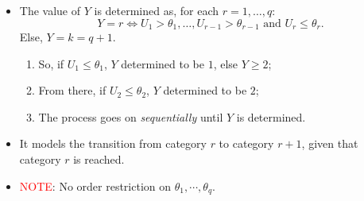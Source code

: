 \documentclass{beamer}
\newenvironment{wideitemize}%
  {\begin{itemize}%
    \setlength{\parskip}{1em}}%
  {\end{itemize}}
\begin{document}
\begin{frame}
\begin{wideitemize}
\item The value of
$Y$ is determined as, for each $r = 1, \dots, q$:
\[
Y = r \iff  U_1 > \theta_1, \dots, U_{r-1} > \theta_{r-1} \text{ and } U_r \leq \theta_r.
\]
Else, $Y = k = q+1$.


%

\begin{enumerate}
\item So, if $U_1 \leq \theta_1$, $Y$ determined to be $1$, else $Y \geq 2$;
\item From there,  if $U_2 \leq \theta_2$, $Y$ determined to be $2$;
\item   The process goes on \emph{sequentially } until $Y$ is determined. 
\end{enumerate}


\item It  models the transition from category $r$ to category $r+1$, 
given that category $r$ is reached.
 

\item
\textcolor{red}{NOTE}: No order restriction on $\theta_1, \cdots, \theta_q$.
\end{wideitemize}

\end{frame}

%
%
\end{document}
